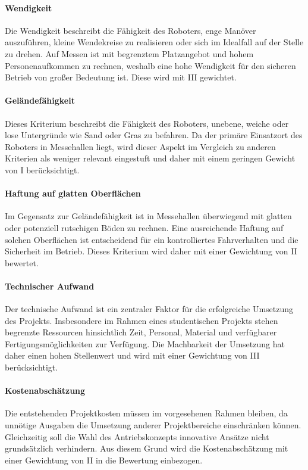 \paragraph{Wendigkeit}
Die Wendigkeit beschreibt die Fähigkeit des Roboters, enge Manöver auszuführen, kleine Wendekreise zu realisieren oder sich im Idealfall auf der Stelle zu drehen. Auf Messen ist mit begrenztem Platzangebot und hohem Personenaufkommen zu rechnen, weshalb eine hohe Wendigkeit für den sicheren Betrieb von großer Bedeutung ist. Diese wird mit III gewichtet.

\paragraph{Geländefähigkeit}
Dieses Kriterium beschreibt die Fähigkeit des Roboters, unebene, weiche oder lose Untergründe wie Sand oder Gras zu befahren. Da der primäre Einsatzort des Roboters in Messehallen liegt, wird dieser Aspekt im Vergleich zu anderen Kriterien als weniger relevant eingestuft und daher mit einem geringen Gewicht von I berücksichtigt.

\paragraph{Haftung auf glatten Oberflächen}
Im Gegensatz zur Geländefähigkeit ist in Messehallen überwiegend mit glatten oder potenziell rutschigen Böden zu rechnen. Eine ausreichende Haftung auf solchen Oberflächen ist entscheidend für ein kontrolliertes Fahrverhalten und die Sicherheit im Betrieb. Dieses Kriterium wird daher mit einer Gewichtung von II bewertet.

\paragraph{Technischer Aufwand}
Der technische Aufwand ist ein zentraler Faktor für die erfolgreiche Umsetzung des Projekts. Insbesondere im Rahmen eines studentischen Projekts stehen begrenzte Ressourcen hinsichtlich Zeit, Personal, Material und verfügbarer Fertigungsmöglichkeiten zur Verfügung. Die Machbarkeit der Umsetzung hat daher einen hohen Stellenwert und wird mit einer Gewichtung von III berücksichtigt.

\paragraph{Kostenabschätzung}
Die entstehenden Projektkosten müssen im vorgesehenen Rahmen bleiben, da unnötige Ausgaben die Umsetzung anderer Projektbereiche einschränken können. Gleichzeitig soll die Wahl des Antriebskonzepts innovative Ansätze nicht grundsätzlich verhindern. Aus diesem Grund wird die Kostenabschätzung mit einer Gewichtung von II in die Bewertung einbezogen.


